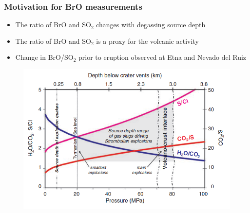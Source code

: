 \documentclass{beamer} %
\begin{document}
\begin{frame}
	\frametitle{\color{mygreen}Motivation for BrO measurements\\%
		\color{mygreen}{\rule{0.8\textwidth}{2pt}}}
	\begin{multicols}{2}
		
		
		\begin{itemize}
			
			
			
			\item The ratio of BrO and SO$_2$ changes with degassing source depth
			\item The ratio of BrO and SO$_2$ is a proxy for the volcanic activity
			\item Change in BrO/SO$_2$ prior to eruption observed at Etna and Nevado del Ruiz
			
		\end{itemize}
		\begin{figure}
			\centering
			\includegraphics[width=1.2\linewidth]{../../Bilder/so2_bro}
			\label{fig:bro_so2}
		\end{figure}
		
	\end{multicols}
\end{frame}


\end{document}
